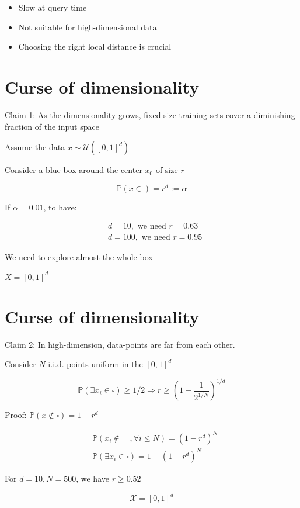 \begin{itemize}
  \item Slow at query time
  \item Not suitable for high-dimensional data
  \item Choosing the right local distance is crucial
\end{itemize}


\section*{Curse of dimensionality}
Claim 1: As the dimensionality grows, fixed-size training sets cover a diminishing fraction of the input space

Assume the data $x \sim \mathcal{U}\left([0,1]^{d}\right)$

Consider a blue box around the center $x_{0}$ of size $r$

$$
\mathbb{P}(x \in)=r^{d}:=\alpha
$$

If $\alpha=0.01$, to have:

$$
\begin{aligned}
& d=10, \text { we need } r=0.63 \\
& d=100, \text { we need } r=0.95
\end{aligned}
$$

We need to explore almost the whole box


$X=[0,1]^{d}$

\section*{Curse of dimensionality}
Claim 2: In high-dimension, data-points are far from each other.

Consider $N$ i.i.d. points uniform in the $[0,1]^{d}$

$$
\mathbb{P}\left(\exists x_{i} \in \square\right) \geq 1 / 2 \Longrightarrow r \geq\left(1-\frac{1}{2^{1 / N}}\right)^{1 / d}
$$

Proof: $\mathbb{P}(x \notin \square)=1-r^{d}$

$$
\begin{aligned}
& \mathbb{P}\left(x_{i} \notin \quad, \forall i \leq N\right)=\left(1-r^{d}\right)^{N} \\
& \mathbb{P}\left(\exists x_{i} \in \square\right)=1-\left(1-r^{d}\right)^{N}
\end{aligned}
$$

For $d=10, N=500$, we have $r \geq 0.52$


$$
\mathscr{X}=[0,1]^{d}
$$

